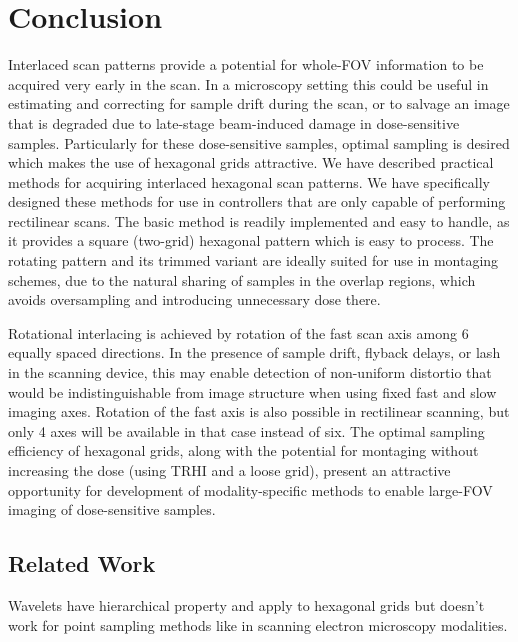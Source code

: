\documentclass[aip, amsmath, amssymb, nobibnotes, nofootinbib, citeautoscript, reprint, superscriptaddress]{revtex4-1}
\begin{document}
    \section{\label{sec:conclusion}Conclusion}

    Interlaced scan patterns provide a potential for whole-FOV information to be acquired very early in the scan.
    In a microscopy setting this could be useful in estimating and correcting for sample drift during the scan, or to salvage an image that is degraded due to late-stage beam-induced damage in dose-sensitive samples.
    Particularly for these dose-sensitive samples, optimal sampling is desired which makes the use of hexagonal grids attractive.
    We have described practical methods for acquiring interlaced hexagonal scan patterns.
    We have specifically designed these methods for use in controllers that are only
    capable of performing rectilinear scans.
    The basic method is readily implemented and easy to handle, as it provides a square (two-grid) hexagonal pattern which is easy to process.
    The rotating pattern and its trimmed variant are ideally suited for use in montaging schemes, due to the natural sharing of samples in the overlap regions, which avoids oversampling and introducing unnecessary dose there.

    Rotational interlacing is achieved by rotation of the fast scan axis among 6 equally spaced directions.
    In the presence of sample drift, flyback delays, or lash in the scanning device, this may enable detection of non-uniform distortio that would be indistinguishable from image structure when using fixed fast and slow imaging axes.
    Rotation of the fast axis is also possible in rectilinear scanning, but only 4 axes will be available in that case instead of six.
    The optimal sampling efficiency of hexagonal grids, along with the potential for montaging without increasing the dose (using TRHI and a loose grid), present an attractive opportunity for development of modality-specific methods to enable large-FOV imaging of dose-sensitive samples.

    \subsection{\label{ssec:wavelets}Related Work}

    Wavelets have hierarchical property and apply to hexagonal grids \cite{hex_compression} but doesn't work for point sampling methods like in scanning electron microscopy modalities.
\end{document}
